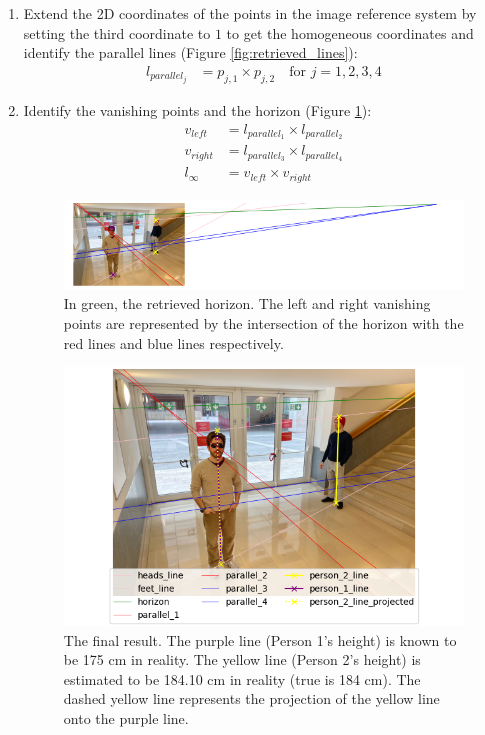 \begin{enumerate}
    
    \item Extend the 2D coordinates of the points in the image reference system by setting the third coordinate to $1$ to get the homogeneous coordinates and identify the parallel lines (Figure \ref{fig:retrieved_lines}):
    \begin{align*}
        l_{parallel_j} &= p_{j,1} \times p_{j,2} \quad \text{for }j=1,2,3,4
    \end{align*}

    \item Identify the vanishing points and the horizon (Figure \ref{fig:wide}):
    \begin{align*}
        v_{left} &= l_{parallel_1} \times l_{parallel_2}\\
        v_{right} &= l_{parallel_3} \times l_{parallel_4}\\
        l_{\infty} &= v_{left} \times v_{right}
    \end{align*}

\begin{figure}
    \centering
    \includegraphics[width=0.75\linewidth]{img/wide.png}
    \caption{In green, the retrieved horizon. The left and right vanishing points are represented by the intersection of the horizon with the red lines and blue lines respectively.}
    \label{fig:wide}
\end{figure}

\begin{figure}
    \centering
    \includegraphics[width=0.55\linewidth]{img/final.png}
    \caption{The final result. The purple line (Person 1's height) is known to be 175 cm in reality. The yellow line (Person 2's height) is estimated to be 184.10 cm in reality (true is 184 cm). The dashed yellow line represents the projection of the yellow line onto the purple line.}
    \label{fig:final}
\end{figure}


\end{enumerate}
